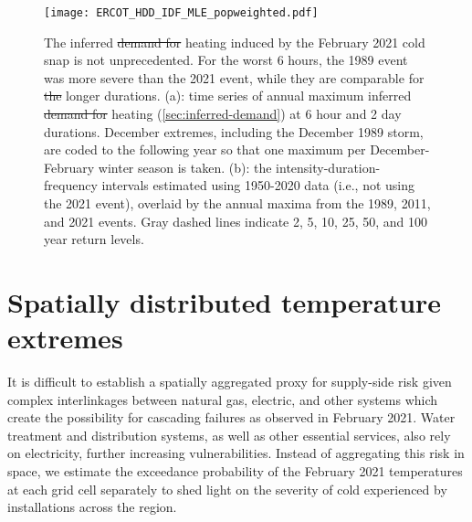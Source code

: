 \documentclass[12pt]{iopart}
\providecommand{\DIFaddtex}[1]{{\protect\color{blue}\uwave{#1}}} %
\providecommand{\DIFdeltex}[1]{{\protect\color{red}\sout{#1}}}                      %
\providecommand{\DIFaddbegin}{} %
\providecommand{\DIFaddend}{} %
\providecommand{\DIFaddFL}[1]{\DIFadd{#1}} %
\providecommand{\DIFdelFL}[1]{\DIFdel{#1}} %
\providecommand{\DIFaddbeginFL}{} %
\providecommand{\DIFaddendFL}{} %
\providecommand{\DIFdelbeginFL}{} %
\providecommand{\DIFdelendFL}{} %
\providecommand{\DIFadd}[1]{\texorpdfstring{\DIFaddtex{#1}}{#1}} %
\providecommand{\DIFdel}[1]{\texorpdfstring{\DIFdeltex{#1}}{}} %
\newcommand{\DIFscaledelfig}{0.5}
\newlength{\DIFdelgraphicswidth} %
\newlength{\DIFdelgraphicsheight} %
\newcommand{\DIFaddincludegraphics}[2][]{{\color{blue}\fbox{\DIFOincludegraphics[#1]{#2}}}} %
\newcommand{\DIFdelincludegraphics}[2][]{%
\sbox{\DIFdelgraphicsbox}{\DIFOincludegraphics[#1]{#2}}%
\settoboxwidth{\DIFdelgraphicswidth}{\DIFdelgraphicsbox} %
\settoboxtotalheight{\DIFdelgraphicsheight}{\DIFdelgraphicsbox} %
\scalebox{\DIFscaledelfig}{%
\parbox[b]{\DIFdelgraphicswidth}{\usebox{\DIFdelgraphicsbox}\\[-\baselineskip] \rule{\DIFdelgraphicswidth}{0em}}\llap{\resizebox{\DIFdelgraphicswidth}{\DIFdelgraphicsheight}{%
\setlength{\unitlength}{\DIFdelgraphicswidth}%
\begin{picture}(1,1)%
\thicklines\linethickness{2pt} %
{\color[rgb]{1,0,0}\put(0,0){\framebox(1,1){}}}%
{\color[rgb]{1,0,0}\put(0,0){\line( 1,1){1}}}%
{\color[rgb]{1,0,0}\put(0,1){\line(1,-1){1}}}%
\end{picture}%
}\hspace*{3pt}}} %
} %
\DeclareRobustCommand{\DIFaddbegin}{\DIFOaddbegin \let\includegraphics\DIFaddincludegraphics} %
\DeclareRobustCommand{\DIFaddend}{\DIFOaddend \let\includegraphics\DIFOincludegraphics} %
\DeclareRobustCommand{\DIFaddbeginFL}{\DIFOaddbeginFL \let\includegraphics\DIFaddincludegraphics} %
\DeclareRobustCommand{\DIFaddendFL}{\DIFOaddendFL \let\includegraphics\DIFOincludegraphics} %
\DeclareRobustCommand{\DIFdelbeginFL}{\DIFOdelbeginFL \let\includegraphics\DIFdelincludegraphics} %
\DeclareRobustCommand{\DIFdelendFL}{\DIFOaddendFL \let\includegraphics\DIFOincludegraphics} %
\begin{document}
\begin{figure}
  \centering
  \texttt{[image: ERCOT\_HDD\_IDF\_MLE\_popweighted.pdf]}
  \caption{
    The inferred \DIFdelbeginFL \DIFdelFL{demand for }\DIFdelendFL heating \DIFaddbeginFL \DIFaddFL{demand per capita }\DIFaddendFL induced by the February 2021 cold snap is not unprecedented.
    For the worst 6 hours, the 1989 event was more severe than the 2021 event, while they are comparable for \DIFdelbeginFL \DIFdelFL{the }\DIFdelendFL longer durations.
    (a): time series of annual maximum inferred \DIFdelbeginFL \DIFdelFL{demand for }\DIFdelendFL heating \DIFaddbeginFL \DIFaddFL{demand per capita }\DIFaddendFL (\cref{sec:inferred-demand}) at 6 hour and 2 day durations.
    December extremes, including the December 1989 storm, are coded to the following year so that one maximum per December-February winter season is taken.
    (b): the intensity-duration-frequency intervals estimated using 1950-2020 data (i.e., not using the 2021 event), overlaid by the annual maxima from the 1989, 2011, and 2021 events.
    Gray dashed lines indicate 2, 5, 10, 25, 50, and 100 year return levels.
  }\label{fig:idf_weighted}
\end{figure}

\section{Spatially distributed temperature extremes}\DIFaddbegin \label{sec:res-spatial}
\DIFaddend

It is difficult to establish a spatially aggregated proxy for supply-side risk given complex interlinkages between natural gas, electric, and other systems which create the possibility for cascading failures as observed in February 2021.
Water treatment and distribution systems, as well as other essential services, also rely on electricity, further increasing vulnerabilities.
Instead of aggregating this risk in space, we estimate the exceedance probability of the February 2021 temperatures at each grid cell separately to shed light on the severity of cold experienced by installations across the region.
\end{document}
